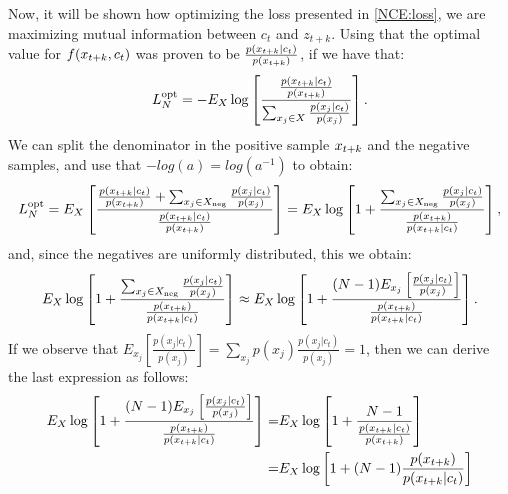 Now, it will be shown how optimizing the loss presented in \ref{NCE:loss}, we are maximizing mutual information between $c_t$ and $z_{t+k}$. Using that the optimal value for $f(x_{t+k},c_t)$ was proven to be $\frac{p(x_{t+k}|c_t)}{p(x_{t+k})}$, if we have that:
\[
L_N^{\operatorname{opt}} = - E_X \log \left[ \frac{\frac{p(x_{t+k}|c_t)}{p(x_{t+k})}}{ \sum_{x_j \in X} \frac{p(x_{j}|c_t)}{p(x_{j})}} \right].
\]
We can split the denominator in the positive sample $x_{t+k}$ and the negative samples, and use that $-log(a) = log(a^{-1})$ to obtain:
\[
L_N^{\operatorname{opt}} = E_X \left[\frac{ \frac{p(x_{t+k}|c_t)}{p(x_{t+k})} + \sum_{x_j \in X_{\operatorname{neg}}} \frac{p(x_j|c_t)}{p(x_j)}  } {\frac{p(x_{t+k}|c_t)}{p(x_{t+k})} } \right] = E_X \log \left[ 1+ \frac{\sum_{x_j \in X_{\operatorname{neg}}}\frac{p(x_j|c_t)}{p(x_j)}}{\frac{p(x_{t+k})}{p(x_{t+k}|c_t)}} \right],
\]
and, since the negatives are uniformly distributed, this we obtain:
\[
E_X \log \left[ 1+ \frac { \sum_{x_j \in X_{\operatorname{neg}}} \frac{p(x_j|c_t)}{p(x_j)}} {\frac{p(x_{t+k})}{p(x_{t+k}|c_t)}} \right] \approx E_X \log \left[ 1+ \frac{ (N-1) E_{x_j}  \left[ \frac{p(x_j|c_t)}{p(x_j)}\right]}{\frac{p(x_{t+k})}{p(x_{t+k}|c_t)}} \right].
\]
If we observe that $E_{x_j} \left[ \frac{p(x_j|c_t)}{p(x_j)} \right] = \sum_{x_j} p(x_j) \frac{p(x_j|c_t)}{p(x_j)} = 1$, then we can derive the last expression as follows:
\begin{align*}
E_X \log \left[ 1+ \frac{ (N-1) E_{x_j}  \left[ \frac{p(x_j|c_t)}{p(x_j)}\right]}{\frac{p(x_{t+k})}{p(x_{t+k}|c_t)}} \right] =  & E_X \log \left[ 1 + \frac{N-1}{ \frac{p(x_{t+k}|c_t)}{p(x_{t+k})}}\right]\\
 = & E_X \log \left[ 1+ (N-1)\frac{p(x_{t+k})}{p(x_{t+k}|c_t)}\right]
\end{align*}

